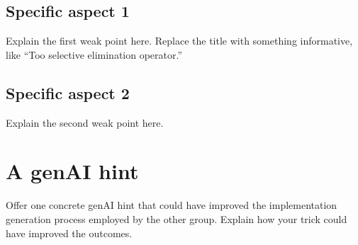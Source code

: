 \documentclass[a4paper,10pt]{article}
\newcommand{\ReplaceMe}[1]{{\color{blue}#1}}
\begin{document}
\subsection{Specific aspect 1}
\ReplaceMe{Explain the first weak point here. Replace the title with something informative, like ``Too selective elimination operator.''}

\subsection{Specific aspect 2}
\ReplaceMe{Explain the second weak point here.}

\section{A genAI hint}
\ReplaceMe{Offer one concrete genAI hint that could have improved the implementation generation process employed by the other group. Explain how your trick could have improved the outcomes.}
\end{document}
